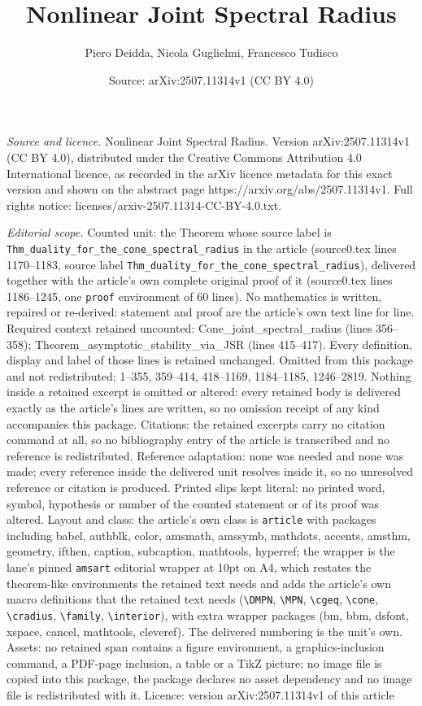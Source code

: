 \documentclass[10pt,a4paper]{amsart}
\title[Nonlinear Joint Spectral Radius]{Nonlinear Joint Spectral Radius}
\author{Piero Deidda, Nicola Guglielmi, Francesco Tudisco}
\date{Source: arXiv:2507.11314v1 (CC BY 4.0)}
\begin{document}
\maketitle

\noindent\emph{Source and licence.} Nonlinear Joint Spectral Radius. Version arXiv:2507.11314v1 (CC BY 4.0), distributed under the Creative Commons Attribution 4.0 International licence, as recorded in the arXiv licence metadata for this exact version and shown on the abstract page https://arxiv.org/abs/2507.11314v1. Full rights notice: licenses/arxiv-2507.11314-CC-BY-4.0.txt.\par\smallskip

\noindent\textit{Editorial scope.} Counted unit: the Theorem whose source label is \texttt{Thm\_duality\_for\_the\_cone\_spectral\_radius} in the article (source0.tex lines 1170--1183, source label \texttt{Thm\_duality\_for\_the\_cone\_spectral\_radius}), delivered together with the article's own complete original proof of it (source0.tex lines 1186--1245, one \texttt{proof} environment of 60 lines). No mathematics is written, repaired or re-derived: statement and proof are the article's own text line for line. Required context retained uncounted: Cone\_joint\_spectral\_radius (lines 356--358); Theorem\_asymptotic\_stability\_via\_JSR (lines 415--417). Every definition, display and label of those lines is retained unchanged. Omitted from this package and not redistributed: 1--355, 359--414, 418--1169, 1184--1185, 1246--2819. Nothing inside a retained excerpt is omitted or altered: every retained body is delivered exactly as the article's lines are written, so no omission receipt of any kind accompanies this package. Citations: the retained excerpts carry no citation command at all, so no bibliography entry of the article is transcribed and no reference is redistributed. Reference adaptation: none was needed and none was made; every reference inside the delivered unit resolves inside it, so no unresolved reference or citation is produced. Printed slips kept literal: no printed word, symbol, hypothesis or number of the counted statement or of its proof was altered. Layout and class: the article's own class is \texttt{article} with packages including babel, authblk, color, amsmath, amssymb, mathdots, accents, amsthm, geometry, ifthen, caption, subcaption, mathtools, hyperref; the wrapper is the lane's pinned \texttt{amsart} editorial wrapper at 10pt on A4, which restates the theorem-like environments the retained text needs and adds the article's own macro definitions that the retained text needs (\texttt{\textbackslash DMPN}, \texttt{\textbackslash MPN}, \texttt{\textbackslash cgeq}, \texttt{\textbackslash cone}, \texttt{\textbackslash cradius}, \texttt{\textbackslash family}, \texttt{\textbackslash interior}), with extra wrapper packages (bm, bbm, dsfont, xspace, cancel, mathtools, cleveref). The delivered numbering is the unit's own. Assets: no retained span contains a figure environment, a graphics-inclusion command, a PDF-page inclusion, a table or a TikZ picture; no image file is copied into this package, the package declares no asset dependency and no image file is redistributed with it. Licence: version arXiv:2507.11314v1 of this article 
\end{document}
